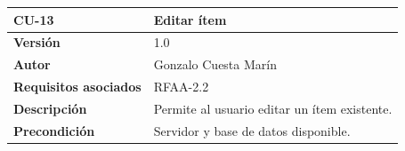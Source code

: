 \documentclass[
]{article}
\begin{document}
\begin{longtable}[]{@{}ll@{}}
\toprule
\begin{minipage}[b]{0.15\columnwidth}\raggedright
\textbf{CU-13}\strut
\end{minipage} & \begin{minipage}[b]{0.79\columnwidth}\raggedright
\textbf{Editar ítem}\strut
\end{minipage}\tabularnewline
\midrule
\endhead
\begin{minipage}[t]{0.15\columnwidth}\raggedright
\textbf{Versión}\strut
\end{minipage} & \begin{minipage}[t]{0.79\columnwidth}\raggedright
1.0\strut
\end{minipage}\tabularnewline
\begin{minipage}[t]{0.15\columnwidth}\raggedright
\textbf{Autor}\strut
\end{minipage} & \begin{minipage}[t]{0.79\columnwidth}\raggedright
Gonzalo Cuesta Marín\strut
\end{minipage}\tabularnewline
\begin{minipage}[t]{0.15\columnwidth}\raggedright
\textbf{Requisitos asociados}\strut
\end{minipage} & \begin{minipage}[t]{0.79\columnwidth}\raggedright
RFAA-2.2\strut
\end{minipage}\tabularnewline
\begin{minipage}[t]{0.15\columnwidth}\raggedright
\textbf{Descripción}\strut
\end{minipage} & \begin{minipage}[t]{0.79\columnwidth}\raggedright
Permite al usuario editar un ítem existente.\strut
\end{minipage}\tabularnewline
\begin{minipage}[t]{0.15\columnwidth}\raggedright
\textbf{Precondición}\strut
\end{minipage} & \begin{minipage}[t]{0.79\columnwidth}\raggedright
Servidor y base de datos disponible.


\end{minipage}
\end{longtable}
\end{document}

